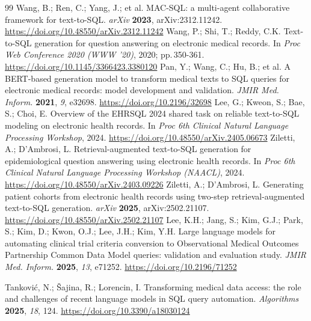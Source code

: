 \documentclass[10pt]{article}
\newcommand{\doilink}[1]{\begingroup\urlstyle{same}\url{#1}\endgroup}
\begin{document}
\begin{thebibliography}{99}
 Wang, B.; Ren, C.; Yang, J.; et al. MAC-SQL: a multi-agent collaborative framework for text-to-SQL. \textit{arXiv} \textbf{2023}, arXiv:2312.11242. \doilink{https://doi.org/10.48550/arXiv.2312.11242}
 Wang, P.; Shi, T.; Reddy, C.K. Text-to-SQL generation for question answering on electronic medical records. In \textit{Proc Web Conference 2020 (WWW '20)}, 2020; pp.\,350-361. \doilink{https://doi.org/10.1145/3366423.3380120}
 Pan, Y.; Wang, C.; Hu, B.; et al. A BERT-based generation model to transform medical texts to SQL queries for electronic medical records: model development and validation. \textit{JMIR Med. Inform.} \textbf{2021}, \textit{9}, e32698. \doilink{https://doi.org/10.2196/32698}
 Lee, G.; Kweon, S.; Bae, S.; Choi, E. Overview of the EHRSQL 2024 shared task on reliable text-to-SQL modeling on electronic health records. In \textit{Proc 6th Clinical Natural Language Processing Workshop}, 2024. \doilink{https://doi.org/10.48550/arXiv.2405.06673}
 Ziletti, A.; D'Ambrosi, L. Retrieval-augmented text-to-SQL generation for epidemiological question answering using electronic health records. In \textit{Proc 6th Clinical Natural Language Processing Workshop (NAACL)}, 2024. \doilink{https://doi.org/10.48550/arXiv.2403.09226}
 Ziletti, A.; D'Ambrosi, L. Generating patient cohorts from electronic health records using two-step retrieval-augmented text-to-SQL generation. \textit{arXiv} \textbf{2025}, arXiv:2502.21107. \doilink{https://doi.org/10.48550/arXiv.2502.21107}
 Lee, K.H.; Jang, S.; Kim, G.J.; Park, S.; Kim, D.; Kwon, O.J.; Lee, J.H.; Kim, Y.H. Large language models for automating clinical trial criteria conversion to Observational Medical Outcomes Partnership Common Data Model queries: validation and evaluation study. \textit{JMIR Med. Inform.} \textbf{2025}, \textit{13}, e71252. \doilink{https://doi.org/10.2196/71252}

 Tankovi\'{c}, N.; \v{S}ajina, R.; Lorencin, I. Transforming medical data access: the role and challenges of recent language models in SQL query automation. \textit{Algorithms} \textbf{2025}, \textit{18}, 124. \doilink{https://doi.org/10.3390/a18030124}


\end{thebibliography}
\end{document}
